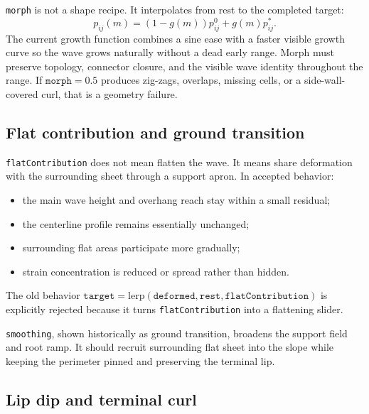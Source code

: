 \documentclass[12pt,letterpaper]{article}
\newcommand{\code}[1]{\texttt{#1}}
\begin{document}
\code{morph} is not a shape recipe. It interpolates from rest to the completed target:
\[
  p_{ij}(m) = (1-g(m))p^0_{ij} + g(m)p^*_{ij}.
\]
The current growth function combines a sine ease with a faster visible growth curve so the wave grows naturally without a dead early range. Morph must preserve topology, connector closure, and the visible wave identity throughout the range. If \(\code{morph}=0.5\) produces zig-zags, overlaps, missing cells, or a side-wall-covered curl, that is a geometry failure.

\subsection{Flat contribution and ground transition}

\code{flatContribution} does not mean flatten the wave. It means share deformation with the surrounding sheet through a support apron. In accepted behavior:
\begin{itemize}
  \item the main wave height and overhang reach stay within a small residual;
  \item the centerline profile remains essentially unchanged;
  \item surrounding flat areas participate more gradually;
  \item strain concentration is reduced or spread rather than hidden.
\end{itemize}
The old behavior \(\code{target}=\mathrm{lerp}(\code{deformed},\code{rest},\code{flatContribution})\) is explicitly rejected because it turns \code{flatContribution} into a flattening slider.

\code{smoothing}, shown historically as ground transition, broadens the support field and root ramp. It should recruit surrounding flat sheet into the slope while keeping the perimeter pinned and preserving the terminal lip.

\subsection{Lip dip and terminal curl}
\end{document}
